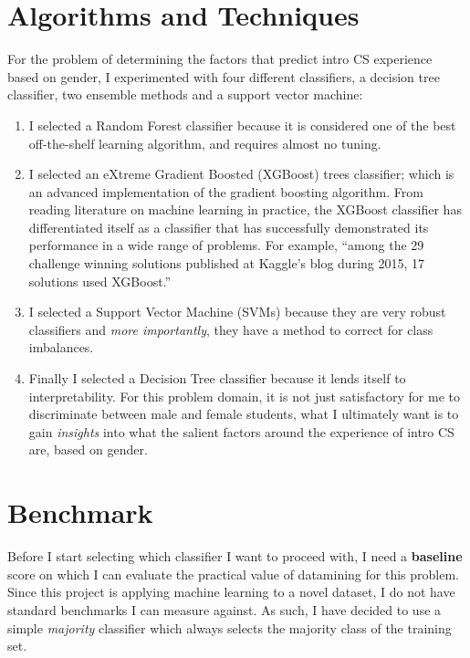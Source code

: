 \section*{Algorithms and Techniques}

For the problem of determining the factors that predict intro CS experience based on gender, I experimented with four different classifiers, a decision tree classifier, two ensemble methods and a support vector machine:

\begin{enumerate}%
\item I selected a Random Forest classifier because it is considered one of the best off-the-shelf learning algorithm, and requires almost no tuning. 

\item I selected an eXtreme Gradient Boosted (XGBoost) trees classifier; which is an advanced implementation of the gradient boosting algorithm. From reading literature on machine learning in practice, the XGBoost classifier has differentiated itself as a classifier that has successfully demonstrated its performance in a wide range of problems. For example, ``among the 29 challenge winning solutions published at Kaggle's blog during 2015, 17 solutions used XGBoost.''

\item I selected a Support Vector Machine (SVMs) because they are very robust classifiers and \textit{more importantly}, they have a method to correct for class imbalances. 
              
\item Finally I selected a Decision Tree classifier because it lends itself to interpretability. For this problem domain, it is not just satisfactory for me to discriminate between male and female students, what I ultimately want is to gain \textit{insights} into what the salient factors around the experience of intro CS are, based on gender.

\end{enumerate}

\section*{Benchmark}

Before I start selecting which classifier I want to proceed with, I need a \textbf{baseline} score on which I can evaluate the practical value of datamining for this problem. Since this project is applying machine learning to a novel dataset, I do not have standard benchmarks I can measure against. As such, I have decided to use a simple \textit{majority} classifier which always selects the majority class of the training set. 

